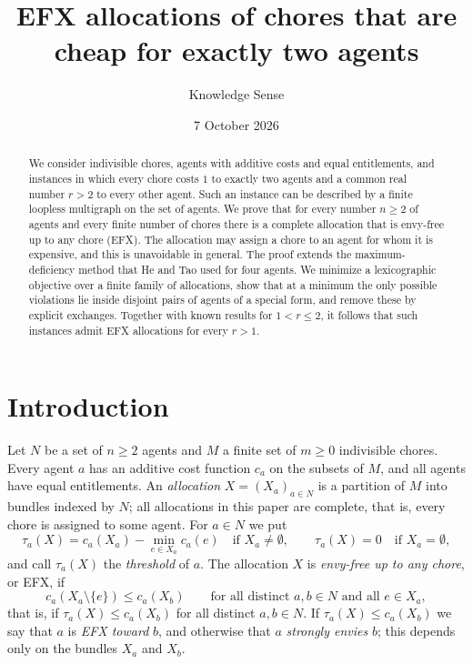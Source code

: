 \documentclass{amsart}
\numberwithin{equation}{section}
\theoremstyle{definition}
\theoremstyle{remark}
\begin{document}
\title[EFX for chores cheap for two agents]{EFX allocations of chores that are cheap for exactly two agents}

\author{Knowledge Sense}
\address{Knowledge Sense}

\date{7 October 2026}



\begin{abstract}
We consider indivisible chores, agents with additive costs and equal entitlements, and instances in which every chore costs $1$ to exactly two agents and a common real number $r>2$ to every other agent. Such an instance can be described by a finite loopless multigraph on the set of agents. We prove that for every number $n\ge 2$ of agents and every finite number of chores there is a complete allocation that is envy-free up to any chore (EFX). The allocation may assign a chore to an agent for whom it is expensive, and this is unavoidable in general. The proof extends the maximum-deficiency method that He and Tao used for four agents. We minimize a lexicographic objective over a finite family of allocations, show that at a minimum the only possible violations lie inside disjoint pairs of agents of a special form, and remove these by explicit exchanges. Together with known results for $1<r\le 2$, it follows that such instances admit EFX allocations for every $r>1$.
\end{abstract}

\maketitle

\section{Introduction}\label{sec:intro}

Let $N$ be a set of $n\ge 2$ agents and $M$ a finite set of $m\ge 0$ indivisible chores. Every agent $a$ has an additive cost function $c_a$ on the subsets of $M$, and all agents have equal entitlements. An \emph{allocation} $X=(X_a)_{a\in N}$ is a partition of $M$ into bundles indexed by $N$; all allocations in this paper are complete, that is, every chore is assigned to some agent. For $a\in N$ we put
\[
\tau_a(X)=c_a(X_a)-\min_{e\in X_a}c_a(e)\quad\text{if }X_a\ne\emptyset,\qquad \tau_a(X)=0\quad\text{if }X_a=\emptyset,
\]
and call $\tau_a(X)$ the \emph{threshold} of $a$. The allocation $X$ is \emph{envy-free up to any chore}, or EFX, if
\[
c_a(X_a\setminus\{e\})\le c_a(X_b)\qquad\text{for all distinct }a,b\in N\text{ and all }e\in X_a,
\]
that is, if $\tau_a(X)\le c_a(X_b)$ for all distinct $a,b\in N$. If $\tau_a(X)\le c_a(X_b)$ we say that $a$ is \emph{EFX toward} $b$, and otherwise that $a$ \emph{strongly envies} $b$; this depends only on the bundles $X_a$ and $X_b$.
\end{document}
